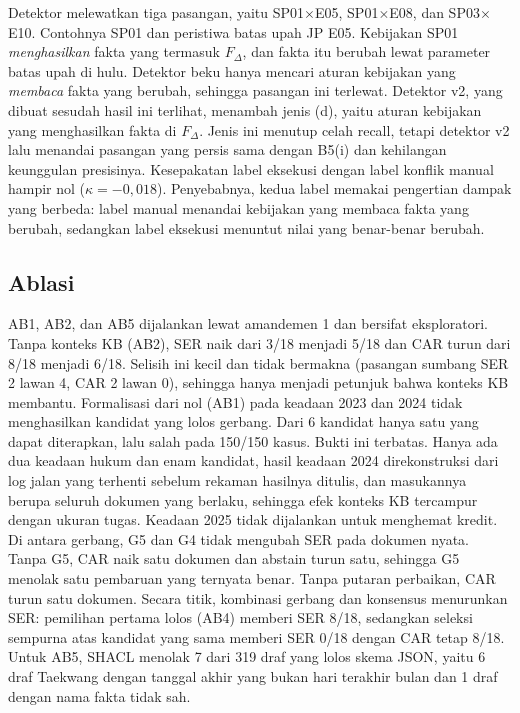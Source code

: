 \documentclass[journal,a4paper]{IEEEtran}
\makeatletter
\DeclareRobustCommand{\en}[1]{{\usefont{\f@encoding}{\f@family}{\f@series}{it}#1\/}}
\makeatother
\begin{document}
Detektor melewatkan tiga pasangan, yaitu SP01$\times$E05, SP01$\times$E08, dan SP03$\times$E10. Contohnya SP01 dan peristiwa batas upah JP E05. Kebijakan SP01 \emph{menghasilkan} fakta yang termasuk $F_\Delta$, dan fakta itu berubah lewat parameter batas upah di hulu. Detektor beku hanya mencari aturan kebijakan yang \emph{membaca} fakta yang berubah, sehingga pasangan ini terlewat. Detektor v2, yang dibuat sesudah hasil ini terlihat, menambah jenis (d), yaitu aturan kebijakan yang menghasilkan fakta di $F_\Delta$. Jenis ini menutup celah \en{recall}, tetapi detektor v2 lalu menandai pasangan yang persis sama dengan B5(i) dan kehilangan keunggulan presisinya. Kesepakatan label eksekusi dengan label konflik manual hampir nol ($\kappa = -0{,}018$). Penyebabnya, kedua label memakai pengertian dampak yang berbeda: label manual menandai kebijakan yang membaca fakta yang berubah, sedangkan label eksekusi menuntut nilai yang benar-benar berubah.

\subsection{Ablasi}
AB1, AB2, dan AB5 dijalankan lewat amandemen 1 dan bersifat eksploratori. Tanpa konteks KB (AB2), SER naik dari 3/18 menjadi 5/18 dan CAR turun dari 8/18 menjadi 6/18. Selisih ini kecil dan tidak bermakna (pasangan sumbang SER 2 lawan 4, CAR 2 lawan 0), sehingga hanya menjadi petunjuk bahwa konteks KB membantu. Formalisasi dari nol (AB1) pada keadaan 2023 dan 2024 tidak menghasilkan kandidat yang lolos gerbang. Dari 6 kandidat hanya satu yang dapat diterapkan, lalu salah pada 150/150 kasus. Bukti ini terbatas. Hanya ada dua keadaan hukum dan enam kandidat, hasil keadaan 2024 direkonstruksi dari log jalan yang terhenti sebelum rekaman hasilnya ditulis, dan masukannya berupa seluruh dokumen yang berlaku, sehingga efek konteks KB tercampur dengan ukuran tugas. Keadaan 2025 tidak dijalankan untuk menghemat kredit. Di antara gerbang, G5 dan G4 tidak mengubah SER pada dokumen nyata. Tanpa G5, CAR naik satu dokumen dan \en{abstain} turun satu, sehingga G5 menolak satu pembaruan yang ternyata benar. Tanpa putaran perbaikan, CAR turun satu dokumen. Secara titik, kombinasi gerbang dan konsensus menurunkan SER: pemilihan pertama lolos (AB4) memberi SER 8/18, sedangkan seleksi sempurna atas kandidat yang sama memberi SER 0/18 dengan CAR tetap 8/18. Untuk AB5, SHACL menolak 7 dari 319 draf yang lolos skema JSON, yaitu 6 draf Taekwang dengan tanggal akhir yang bukan hari terakhir bulan dan 1 draf dengan nama fakta tidak sah.
\end{document}
